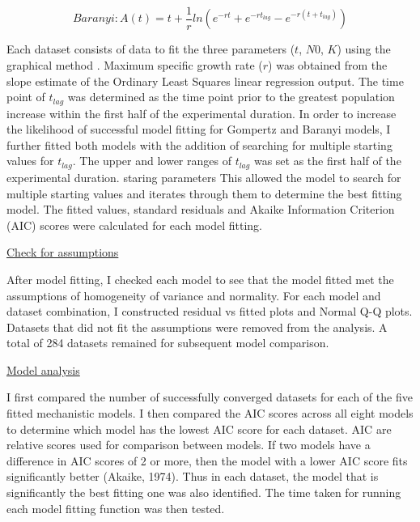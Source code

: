\documentclass[11pt]{article}
\begin{document}
\begin{equation} 
  Baranyi: A(t) = t + \frac{1}{r}ln(e^{-rt}+e^{-rt_{lag}}- e^{-r(t+t_{lag})}) 
\end{equation}


Each dataset consists of data to fit the three parameters (\(t\), \(N0\), \(K\)) using the graphical method \cite{holmstrom_review_2002}. Maximum specific growth rate (\(r\)) was obtained from the slope estimate of the Ordinary Least Squares linear regression output. The time point of \(t_{lag}\) was determined as the time point prior to the greatest population increase within the first half of the experimental duration. In order to increase the likelihood of successful model fitting for Gompertz and Baranyi models, I further fitted both models with the addition of searching for multiple starting values for \(t_{lag}\). The upper and lower ranges of \(t_{lag}\) was set as the first half of the experimental duration. staring parameters This allowed the model to search for multiple starting values and iterates through them to determine the best fitting model. The fitted values, standard residuals and Akaike Information Criterion (AIC) scores were calculated for each model fitting.
\vspace{\baselineskip}

\underline{Check for assumptions} 

After model fitting, I checked each model to see that the model fitted met the assumptions of homogeneity of variance and normality. For each model and dataset combination, I constructed residual vs fitted plots and Normal Q-Q plots. Datasets that did not fit the assumptions were removed from the analysis. A total of 284 datasets remained for subsequent model comparison.
\vspace{\baselineskip}

\underline{Model analysis}

I first compared the number of successfully converged datasets for each of the five fitted mechanistic models. I then compared the AIC scores across all eight models to determine which model has the lowest AIC score for each dataset. AIC are relative scores used for comparison between models. If two models have a difference in AIC scores of 2 or more, then the model with a lower AIC score fits significantly better (Akaike, 1974). Thus in each dataset, the model that is significantly the best fitting one was also identified. The time taken for running each model fitting function was then tested. 
\vspace{\baselineskip}
\end{document}
